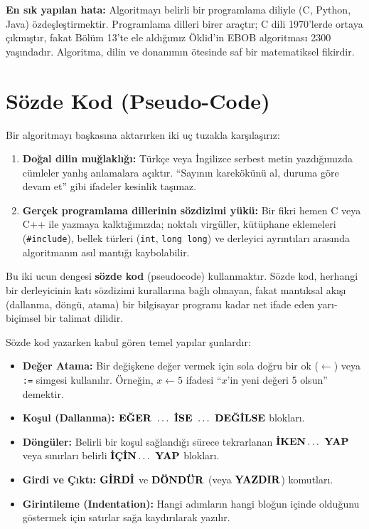 \begin{caution}
\textbf{En sık yapılan hata:} Algoritmayı belirli bir programlama diliyle (C, Python, Java) özdeşleştirmektir. Programlama dilleri birer araçtır; C dili 1970'lerde ortaya çıkmıştır, fakat Bölüm 13'te ele aldığımız Öklid'in EBOB algoritması 2300 yaşındadır. Algoritma, dilin ve donanımın ötesinde saf bir matematiksel fikirdir.
\end{caution}

\section{Sözde Kod (Pseudo-Code)}

Bir algoritmayı başkasına aktarırken iki uç tuzakla karşılaşırız:
\begin{enumerate}
    \item \textbf{Doğal dilin muğlaklığı:} Türkçe veya İngilizce serbest metin yazdığımızda cümleler yanlış anlamalara açıktır. ``Sayının karekökünü al, duruma göre devam et'' gibi ifadeler kesinlik taşımaz.
    \item \textbf{Gerçek programlama dillerinin sözdizimi yükü:} Bir fikri hemen C veya C++ ile yazmaya kalktığımızda; noktalı virgüller, kütüphane eklemeleri (\texttt{\#include}), bellek türleri (\texttt{int}, \texttt{long long}) ve derleyici ayrıntıları arasında algoritmanın asıl mantığı kaybolabilir.
\end{enumerate}

Bu iki ucun dengesi \textbf{sözde kod} (pseudocode) kullanmaktır. Sözde kod, herhangi bir derleyicinin katı sözdizimi kurallarına bağlı olmayan, fakat mantıksal akışı (dallanma, döngü, atama) bir bilgisayar programı kadar net ifade eden yarı-biçimsel bir talimat dilidir.

Sözde kod yazarken kabul gören temel yapılar şunlardır:
\begin{itemize}
    \item \textbf{Değer Atama:} Bir değişkene değer vermek için sola doğru bir ok ($\leftarrow$) veya \texttt{:=} simgesi kullanılır. Örneğin, $x \leftarrow 5$ ifadesi ``$x$'in yeni değeri 5 olsun'' demektir.
    \item \textbf{Koşul (Dallanma):} $\text{\textbf{EĞER }} \dots \text{\textbf{ İSE }} \dots \text{\textbf{ DEĞİLSE}}$ blokları.
    \item \textbf{Döngüler:} Belirli bir koşul sağlandığı sürece tekrarlanan $\text{\textbf{İKEN}} \dots \text{\textbf{ YAP}}$ veya sınırları belirli $\text{\textbf{İÇİN}} \dots \text{\textbf{ YAP}}$ blokları.
    \item \textbf{Girdi ve Çıktı:} $\text{\textbf{GİRDİ}}$ ve $\text{\textbf{DÖNDÜR}}$ (veya $\text{\textbf{YAZDIR}}$) komutları.
    \item \textbf{Girintileme (Indentation):} Hangi adımların hangi bloğun içinde olduğunu göstermek için satırlar sağa kaydırılarak yazılır.
\end{itemize}

